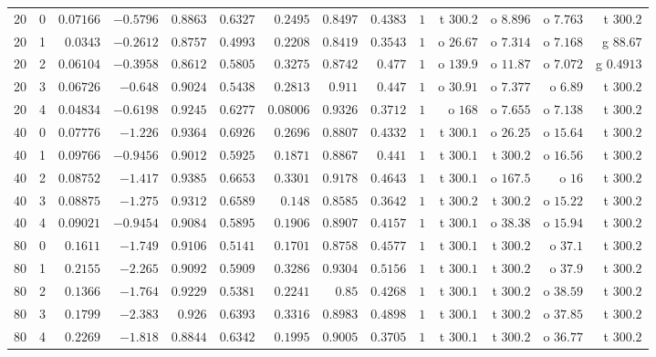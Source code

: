 \begin{table}[ht]
\begin{tabular}{@{}rrrrrrrrrrrrrr@{}}
20 & 0 & $0.07166$ & $-0.5796$ & $0.8863$ & $0.6327$ & $0.2495$ & $0.8497$ & $0.4383$ & $1$ & t $300.2$ & o $8.896$ & o $7.763$ & t $300.2$\\
20 & 1 & $0.0343$ & $-0.2612$ & $0.8757$ & $0.4993$ & $0.2208$ & $0.8419$ & $0.3543$ & $1$ & o $26.67$ & o $7.314$ & o $7.168$ & g $88.67$\\
20 & 2 & $0.06104$ & $-0.3958$ & $0.8612$ & $0.5805$ & $0.3275$ & $0.8742$ & $0.477$ & $1$ & o $139.9$ & o $11.87$ & o $7.072$ & g $0.4913$\\
20 & 3 & $0.06726$ & $-0.648$ & $0.9024$ & $0.5438$ & $0.2813$ & $0.911$ & $0.447$ & $1$ & o $30.91$ & o $7.377$ & o $6.89$ & t $300.2$\\
20 & 4 & $0.04834$ & $-0.6198$ & $0.9245$ & $0.6277$ & $0.08006$ & $0.9326$ & $0.3712$ & $1$ & o $168$ & o $7.655$ & o $7.138$ & t $300.2$\\
40 & 0 & $0.07776$ & $-1.226$ & $0.9364$ & $0.6926$ & $0.2696$ & $0.8807$ & $0.4332$ & $1$ & t $300.1$ & o $26.25$ & o $15.64$ & t $300.2$\\
40 & 1 & $0.09766$ & $-0.9456$ & $0.9012$ & $0.5925$ & $0.1871$ & $0.8867$ & $0.441$ & $1$ & t $300.1$ & t $300.2$ & o $16.56$ & t $300.2$\\
40 & 2 & $0.08752$ & $-1.417$ & $0.9385$ & $0.6653$ & $0.3301$ & $0.9178$ & $0.4643$ & $1$ & t $300.1$ & o $167.5$ & o $16$ & t $300.2$\\
40 & 3 & $0.08875$ & $-1.275$ & $0.9312$ & $0.6589$ & $0.148$ & $0.8585$ & $0.3642$ & $1$ & t $300.2$ & t $300.2$ & o $15.22$ & t $300.2$\\
40 & 4 & $0.09021$ & $-0.9454$ & $0.9084$ & $0.5895$ & $0.1906$ & $0.8907$ & $0.4157$ & $1$ & t $300.1$ & o $38.38$ & o $15.94$ & t $300.2$\\
80 & 0 & $0.1611$ & $-1.749$ & $0.9106$ & $0.5141$ & $0.1701$ & $0.8758$ & $0.4577$ & $1$ & t $300.1$ & t $300.2$ & o $37.1$ & t $300.2$\\
80 & 1 & $0.2155$ & $-2.265$ & $0.9092$ & $0.5909$ & $0.3286$ & $0.9304$ & $0.5156$ & $1$ & t $300.1$ & t $300.2$ & o $37.9$ & t $300.2$\\
80 & 2 & $0.1366$ & $-1.764$ & $0.9229$ & $0.5381$ & $0.2241$ & $0.85$ & $0.4268$ & $1$ & t $300.1$ & t $300.2$ & o $38.59$ & t $300.2$\\
80 & 3 & $0.1799$ & $-2.383$ & $0.926$ & $0.6393$ & $0.3316$ & $0.8983$ & $0.4898$ & $1$ & t $300.1$ & t $300.2$ & o $37.85$ & t $300.2$\\
80 & 4 & $0.2269$ & $-1.818$ & $0.8844$ & $0.6342$ & $0.1995$ & $0.9005$ & $0.3705$ & $1$ & t $300.1$ & t $300.2$ & o $36.77$ & t $300.2$\\
\bottomrule
\end{tabular}
\end{table}

